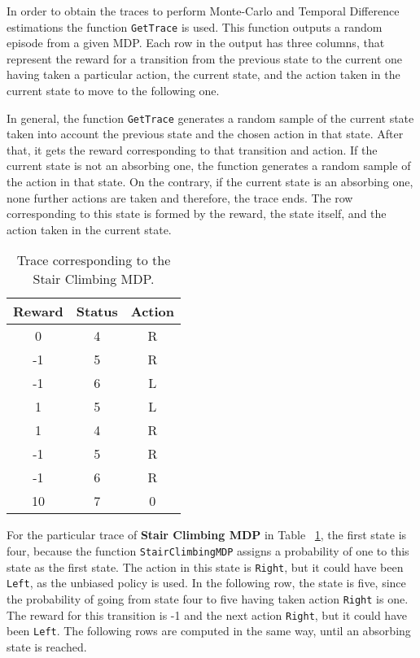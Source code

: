 \documentclass[11pt]{article}   	%
\begin{document}
In order to obtain the traces to perform Monte-Carlo and Temporal Difference estimations the function \texttt{GetTrace} is used. This function outputs a random episode from a given MDP. Each row in the output has three columns, that represent the reward for a transition from the previous state to the current one having taken a particular action, the current state, and the action taken in the current state to move to the following one.

In general, the function \texttt{GetTrace} generates a random sample of the current state taken into account the previous state and the chosen action in that state. After that, it gets the reward corresponding to that transition and action. If the current state is not an absorbing one, the function generates a random sample of the action in that state. On the contrary, if the current state is an absorbing one, none further actions are taken and therefore, the trace ends. The row corresponding to this state is formed by the reward, the state itself, and the action taken in the current state.

\begin{table}[!h] 
	\begin{center}
		\begin{tabular}{ | c c  c | }
		\hline
		Reward & Status & Action \\ \hline \hline
		0 & 4 & R \\ \hline
		-1 & 5 & R \\ \hline
		-1 & 6 & L \\ \hline
		1 & 5 & L \\ \hline
		1 & 4 & R \\ \hline
		-1 & 5 & R \\ \hline
		-1 & 6 & R \\ \hline
		10 & 7 & 0 \\ \hline
		\end{tabular}
		\caption{Trace corresponding to the Stair Climbing MDP.\label{tab:traceStair}}
		
	\end{center}
\end{table}

For the particular trace of \textbf{Stair Climbing MDP} in Table ~\ref{tab:traceStair}, the first state is four, because the function \texttt{StairClimbingMDP} assigns a probability of one to this state as the first state. The action in this state is \texttt{Right}, but it could have been \texttt{Left}, as the unbiased policy is used. In the following row, the state is five, since the probability of going from state four to five having taken action \texttt{Right} is one. The reward for this transition is -1 and the next action \texttt{Right}, but it could have been \texttt{Left}. The following rows are computed in the same way, until an absorbing state is reached.
\end{document}
